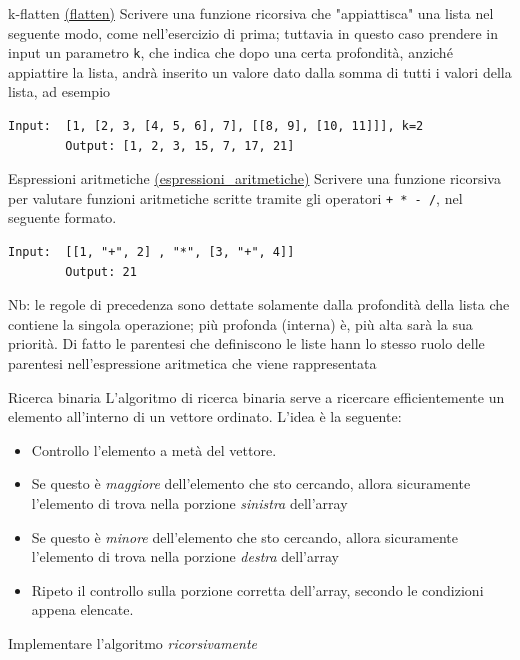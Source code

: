 \begin{esercizio}{k-flatten \href{run:./files/python/esercizi/ricorsione}{(flatten)}}
	Scrivere una funzione ricorsiva che "appiattisca" una lista nel seguente modo, come nell'esercizio di prima; tuttavia in questo caso prendere in input un parametro \verb|k|, che indica che dopo una certa profondità, anziché appiattire la lista, andrà inserito un valore dato dalla somma di tutti i valori della lista, ad esempio

	\begin{lstlisting}[frame = none]
		Input:  [1, [2, 3, [4, 5, 6], 7], [[8, 9], [10, 11]]], k=2
		Output: [1, 2, 3, 15, 7, 17, 21]
  \end{lstlisting}
\end{esercizio}

\begin{esercizio}{Espressioni aritmetiche \href{run:./files/python/esercizi/ricorsione}{(espressioni\_aritmetiche)}}
	Scrivere una funzione ricorsiva per valutare funzioni aritmetiche scritte tramite gli operatori \verb|+ * - /|, nel seguente formato.
	\begin{lstlisting}[frame = none]
    Input:  [[1, "+", 2] , "*", [3, "+", 4]]
		Output: 21
  \end{lstlisting}
	Nb: le regole di precedenza sono dettate solamente dalla profondità della lista che contiene la singola operazione; più profonda (interna) è, più alta sarà la sua priorità. Di fatto le parentesi che definiscono le liste hann lo stesso ruolo delle parentesi nell'espressione aritmetica che viene rappresentata
\end{esercizio}





\begin{esercizio}{Ricerca binaria}
	L'algoritmo di ricerca binaria serve a ricercare efficientemente un elemento all'interno di un vettore ordinato. L'idea è la seguente:
	\begin{itemize}
		\item Controllo l'elemento a metà del vettore.
		\item Se questo è \textit{maggiore} dell'elemento che sto cercando, allora sicuramente l'elemento di trova nella porzione  \textit{sinistra} dell'array
		\item Se questo è \textit{minore} dell'elemento che sto cercando, allora sicuramente l'elemento di trova nella porzione  \textit{destra} dell'array
		\item Ripeto il controllo sulla porzione corretta dell'array, secondo le condizioni appena elencate.
	\end{itemize}
	Implementare l'algoritmo \textit{ricorsivamente}
\end{esercizio}


